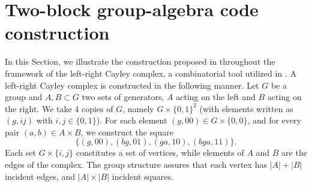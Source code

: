 \documentclass[a4paper,twocolumn,11pt,accepted=2026-05-03]{quantumarticle}
\begin{document}
\section{Two-block group-algebra code construction}
\label{sec:2bga}

In this Section, we illustrate the construction proposed in \cite{pryadko2024twoblock} throughout the framework of the left-right Cayley complex, a combinatorial tool utilized in \cite{panteleev_asymptotically_2022,leverrier_quantum_2022,dinur_good_2023}.
A left-right Cayley complex is constructed in the following manner. Let $G$ be a group and $A,B \subset G$ two sets of generators, $A$ acting on the left and $B$ acting on the right. We take 4 copies of $G$, namely 
$G\times \{0,1\}^2$
(with elements written as $(g,ij)$ with $i,j\in \{0,1\}$). 
For each element $(g,00) \in G\times \{0,0\}$, and for every pair $(a,b) \in A\times B$, we construct the square 
$$
\{(g,00), (bg,01), (ga,10), (bga,11)\}.
$$  
Each set $G\times \{i,j\}$ constitutes a set of vertices, while elements of $A$ and $B$ are the edges of the complex. The group structure assures that each vertex has $|A|+|B|$ incident edges, and $|A|\times|B|$ incident squares.
\end{document}
